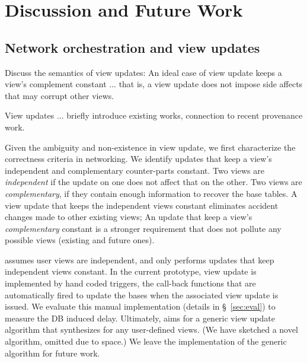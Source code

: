 \section{Discussion and Future Work}
\label{sec:discussion}

\subsection{Network orchestration and view updates}

Discuss the semantics of view updates: An ideal case of view update
keeps a view's complement constant ... that is, a view update does not
impose side affects that may corrupt other views.

View updates ... briefly introduce existing works, connection to
recent provenance work.

Given the ambiguity and non-existence in view update, we first
characterize the correctness criteria in networking. We identify
updates that keep a view's independent and complementary counter-parts
constant. Two views are \textit{independent} if the update on one does
not affect that on the other. Two views are \textit{complementary}, if
they contain enough information to recover the base tables.
A view update that keeps the independent views constant eliminates
accident changes made to other existing views; An update that keep a
view's \textit{complementary} constant is a stronger requirement that
does not pollute any possible views (existing and future ones).

\Sys assumes user views are independent, and only performs updates
that keep independent views constant.  In the current prototype, view
update is implemented by hand coded triggers, the call-back functions
that are automatically fired to update the bases when the associated
view update is issued. We evaluate this manual implementation (details
in \S~\ref{sec:eval}) to measure the DB induced delay.
Ultimately, \Sys aims for a generic view update algorithm that
synthesizes for any user-defined views. (We have sketched a novel
algorithm, omitted due to space.) We leave the implementation of the
generic algorithm for future work.


